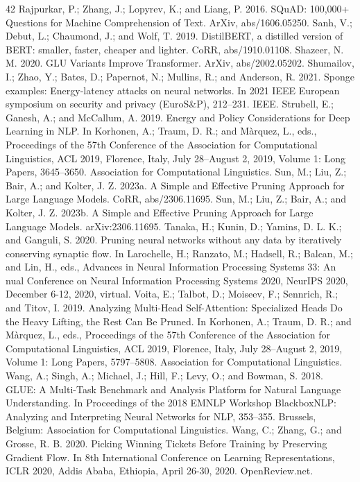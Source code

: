 \documentclass[conference]{IEEEtran}
\begin{document}
\begin{thebibliography}{42}
 Rajpurkar, P.; Zhang, J.; Lopyrev, K.; and Liang, P. 2016. SQuAD: 100,000+ Questions for Machine Comprehension of Text. ArXiv, abs/1606.05250.
 Sanh, V.; Debut, L.; Chaumond, J.; and Wolf, T. 2019. DistilBERT, a distilled version of BERT: smaller, faster, cheaper and lighter. CoRR, abs/1910.01108.
 Shazeer, N. M. 2020. GLU Variants Improve Transformer. ArXiv, abs/2002.05202.
 Shumailov, I.; Zhao, Y.; Bates, D.; Papernot, N.; Mullins, R.; and Anderson, R. 2021. Sponge examples: Energy-latency attacks on neural networks. In 2021 IEEE European symposium on security and privacy (EuroS\&P), 212–231. IEEE.
 Strubell, E.; Ganesh, A.; and McCallum, A. 2019. Energy and Policy Considerations for Deep Learning in NLP. In Korhonen, A.; Traum, D. R.; and Màrquez, L., eds., Proceedings of the 57th Conference of the Association for Computational Linguistics, ACL 2019, Florence, Italy, July 28–August 2, 2019, Volume 1: Long Papers, 3645–3650. Association for Computational Linguistics.
 Sun, M.; Liu, Z.; Bair, A.; and Kolter, J. Z. 2023a. A Simple and Effective Pruning Approach for Large Language Models. CoRR, abs/2306.11695.
 Sun, M.; Liu, Z.; Bair, A.; and Kolter, J. Z. 2023b. A Simple and Effective Pruning Approach for Large Language Models. arXiv:2306.11695.
 Tanaka, H.; Kunin, D.; Yamins, D. L. K.; and Ganguli, S. 2020. Pruning neural networks without any data by iteratively conserving synaptic flow. In Larochelle, H.; Ranzato, M.; Hadsell, R.; Balcan, M.; and Lin, H., eds., Advances in Neural Information Processing Systems 33: An
 nual Conference on Neural Information Processing Systems 2020, NeurIPS 2020, December 6-12, 2020, virtual.
 Voita, E.; Talbot, D.; Moiseev, F.; Sennrich, R.; and Titov, I. 2019. Analyzing Multi-Head Self-Attention: Specialized Heads Do the Heavy Lifting, the Rest Can Be Pruned. In Korhonen, A.; Traum, D. R.; and Màrquez, L., eds., Proceedings of the 57th Conference of the Association for Computational Linguistics, ACL 2019, Florence, Italy, July 28–August 2, 2019, Volume 1: Long Papers, 5797–5808. Association for Computational Linguistics.
 Wang, A.; Singh, A.; Michael, J.; Hill, F.; Levy, O.; and Bowman, S. 2018. GLUE: A Multi-Task Benchmark and Analysis Platform for Natural Language Understanding. In Proceedings of the 2018 EMNLP Workshop BlackboxNLP: Analyzing and Interpreting Neural Networks for NLP, 353–355. Brussels, Belgium: Association for Computational Linguistics.
 Wang, C.; Zhang, G.; and Grosse, R. B. 2020. Picking Winning Tickets Before Training by Preserving Gradient Flow. In 8th International Conference on Learning Representations, ICLR 2020, Addis Ababa, Ethiopia, April 26-30, 2020. OpenReview.net.

\end{thebibliography}
\end{document}

